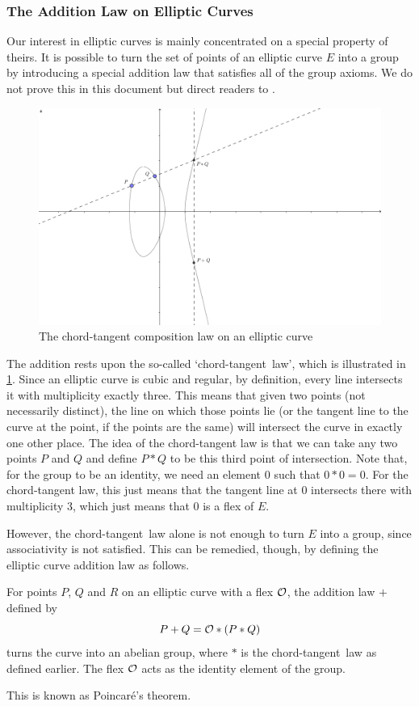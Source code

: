 \subsubsection{The Addition Law on Elliptic Curves}
Our interest in elliptic curves is mainly concentrated on a special property of theirs.
It is possible to turn the set of points of an elliptic curve $E$ into a group by introducing a special addition law that satisfies all of the group axioms.
We do not prove this in this document but direct readers to \cite{silverman2009}.
\begin{figure}[htbp]
	\centering
	\includegraphics[scale=0.3]{../Figures/ellipticaddition.png}
	\caption{The chord-tangent composition law on an elliptic curve}
	\label{ellipticaddition}
\end{figure}
The addition rests upon the so-called `chord-tangent~law', which is illustrated in \cref{ellipticaddition}.
Since an elliptic curve is cubic and regular, by definition, every line intersects it with multiplicity exactly three.
This means that given two points (not necessarily distinct), the line on which those points lie (or the tangent line to the curve at the point, if the points are the same) will intersect the curve in exactly one other place.
The idea of the chord-tangent law is that we can take any two points $P$ and $Q$ and define $P * Q$ to be this third point of intersection.
Note that, for the group to be an identity, we need an element $0$ such that $0 * 0 = 0$.
For the chord-tangent law, this just means that the tangent line at $0$ intersects there with multiplicity 3, which just means that $0$ is a flex of $E$.

However, the chord-tangent~law alone is not enough to turn $E$ into a group, since associativity is not satisfied.
This can be remedied, though, by defining the elliptic curve addition law as follows.
\begin{theorem}
	For points $P$, $Q$ and $R$ on an elliptic curve with a flex $\mathcal{O}$, the addition law $+$ defined by
	$$P + Q = \mathcal{O} * (P * Q)$$
	turns the curve into an abelian group, where $*$ is the chord-tangent~law as defined earlier.
	The flex $\mathcal{O}$ acts as the identity element of the group.
\end{theorem}
This is known as Poincaré's theorem.
